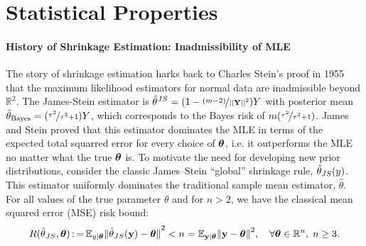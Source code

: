 \documentclass[11pt]{article}
\renewcommand{\E}{\mathbb E}
\numberwithin{equation}{section}
\begin{document}
\section{Statistical Properties}\label{sec:stat-prop}

\paragraph{History of Shrinkage Estimation: Inadmissibility of MLE } The story of shrinkage estimation harks back to Charles Stein's proof in 1955 that the maximum likelihood estimators for normal data are inadmissible beyond $\mathbb{R}^2$. The James-Stein estimator is $\hat{\theta}^{JS} = (1 - \nicefrac{(m-2)}{\left|\left|{\bf Y}\right|\right|^2})Y$ with posterior mean $\hat{\theta}_{\mathrm{Bayes}} = (\nicefrac{\tau^2}{\tau^2+1}) Y$, which corresponds to the Bayes risk of $m(\nicefrac{\tau^2}{\tau^2+1})$. %
James and Stein proved that this estimator dominates the MLE in terms of the expected total squarred error for every choice of $\boldsymbol{\theta}$, i.e. it outperforms the MLE no matter what the true $\boldsymbol{\theta}$ is. To motivate the need for developing new prior distributions, consider the classic James--Stein ``global'' shrinkage rule, ${\hat{\theta}}_{JS}{}(y)$. This estimator uniformly dominates the traditional sample mean estimator, $\hat{\theta}$. For all values of the true parameter $\theta$ and for $n>2$, we have the classical mean squared error (MSE) risk bound:
\[
R(\estJs, \btheta) \defeq \E_{y \mid \btheta} {\Vert \estJs(\y) - \btheta \Vert}^2 < n = \E_{\y \mid \btheta} {\Vert \y - \btheta \Vert}^2, \quad \forall \btheta \in \mathbb{R}^n, \; n \ge 3.
\]
\end{document}
